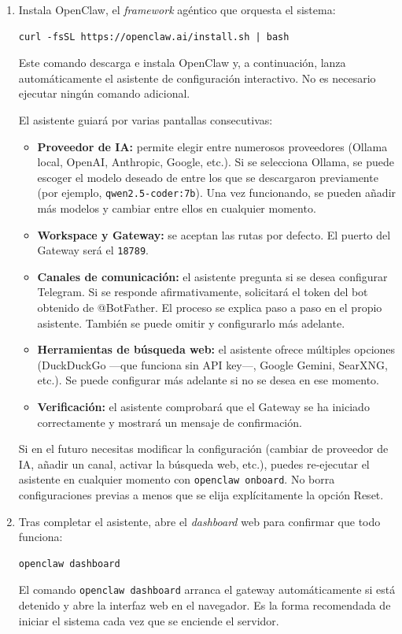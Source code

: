 \begin{enumerate}
    \item Instala OpenClaw, el \textit{framework} agéntico que orquesta el sistema:
\begin{verbatim}
curl -fsSL https://openclaw.ai/install.sh | bash
\end{verbatim}
    Este comando descarga e instala OpenClaw y, a continuación, lanza automáticamente el asistente de configuración interactivo. No es necesario ejecutar ningún comando adicional.

    El asistente guiará por varias pantallas consecutivas:

    \begin{itemize}
        \item \textbf{Proveedor de IA:} permite elegir entre numerosos proveedores (Ollama local, OpenAI, Anthropic, Google, etc.). Si se selecciona Ollama, se puede escoger el modelo deseado de entre los que se descargaron previamente (por ejemplo, \texttt{qwen2.5-coder:7b}). Una vez funcionando, se pueden añadir más modelos y cambiar entre ellos en cualquier momento.

        \item \textbf{Workspace y Gateway:} se aceptan las rutas por defecto. El puerto del Gateway será el \texttt{18789}.

        \item \textbf{Canales de comunicación:} el asistente pregunta si se desea configurar Telegram. Si se responde afirmativamente, solicitará el token del bot obtenido de @BotFather. El proceso se explica paso a paso en el propio asistente. También se puede omitir y configurarlo más adelante.

        \item \textbf{Herramientas de búsqueda web:} el asistente ofrece múltiples opciones (DuckDuckGo ---que funciona sin API key---, Google Gemini, SearXNG, etc.). Se puede configurar más adelante si no se desea en ese momento.

        \item \textbf{Verificación:} el asistente comprobará que el Gateway se ha iniciado correctamente y mostrará un mensaje de confirmación.
    \end{itemize}

    Si en el futuro necesitas modificar la configuración (cambiar de proveedor de IA, añadir un canal, activar la búsqueda web, etc.), puedes re-ejecutar el asistente en cualquier momento con \texttt{openclaw onboard}. No borra configuraciones previas a menos que se elija explícitamente la opción Reset.

    \item Tras completar el asistente, abre el \textit{dashboard} web para confirmar que todo funciona:
\begin{verbatim}
openclaw dashboard
\end{verbatim}
    El comando \texttt{openclaw dashboard} arranca el gateway automáticamente si está detenido y abre la interfaz web en el navegador. Es la forma recomendada de iniciar el sistema cada vez que se enciende el servidor.
\end{enumerate}

